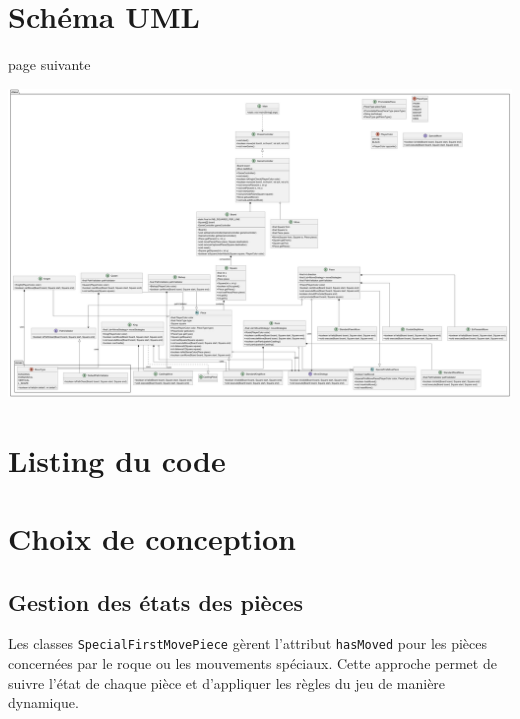 \documentclass[12pt]{report}
\begin{document}
    \section*{Schéma UML}
    page suivante
    \newpage
    \includegraphics[scale=0.4,keepaspectratio, angle=90 ]{images/schema_uml}


    \section*{Listing du code}
    
    
    









    \section*{Choix de conception}
    \subsection*{Gestion des états des pièces}
    Les classes \texttt{SpecialFirstMovePiece} gèrent l'attribut \texttt{hasMoved} pour les pièces concernées par le roque ou les mouvements spéciaux. Cette approche permet de suivre l'état de chaque pièce et d'appliquer les règles du jeu de manière dynamique.
\end{document}
